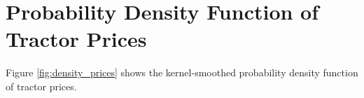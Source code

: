 %
%
%
%
%
%
%
%
%






\section{Probability Density Function of Tractor Prices}

Figure \ref{fig:density_prices} shows  the kernel-smoothed probability density function of tractor prices.

